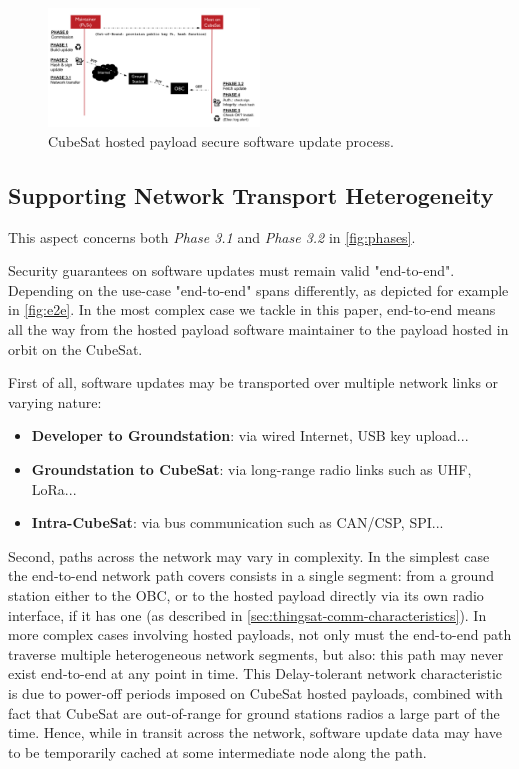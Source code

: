\begin{figure}[t]
    \centering
    \includegraphics[width=0.5\textwidth]{Figures/CubeSat-Payload-update.png}
    \caption{CubeSat hosted payload secure software update process.}
    \label{fig:phases}
\end{figure}

\subsection{Supporting Network Transport Heterogeneity}
This aspect concerns both \textit{Phase 3.1} and \textit{Phase 3.2} in \autoref{fig:phases}. 

Security guarantees on software updates must remain valid "end-to-end".
Depending on the use-case "end-to-end" spans differently, as depicted for example in \autoref{fig:e2e}. In the most complex case we tackle in this paper, end-to-end means all the way from the hosted payload software maintainer to the payload hosted in orbit on the CubeSat.

First of all, software updates may be transported over multiple network links or varying nature: 
\begin{itemize}
\item {\bf Developer to Groundstation}: via wired Internet, USB key upload...
\item {\bf Groundstation to CubeSat}: via long-range radio links such as UHF, LoRa...
\item {\bf Intra-CubeSat}: via bus communication such as CAN/CSP, SPI...
\end{itemize}

Second, paths across the network may vary in complexity.
In the simplest case the end-to-end network path covers consists in a single segment: from a ground station either to the OBC, or to the hosted payload directly via its own radio interface, if it has one (as described in \autoref{sec:thingsat-comm-characteristics}).
In more complex cases involving hosted payloads, not only
must the end-to-end path traverse multiple heterogeneous network segments,
but also: this path may never exist end-to-end at any point in time.
This Delay-tolerant network characteristic is due to power-off periods imposed on CubeSat hosted payloads, 
combined with fact that CubeSat are out-of-range for ground stations radios a large part of the time.
Hence, while in transit across the network, software update data may have to be temporarily cached at some intermediate node along the path.


